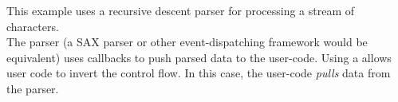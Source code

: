 \label{appendix}
This example uses a recursive descent parser for processing a stream of
characters.\\
The parser (a SAX parser or other event-dispatching framework would be
equivalent) uses callbacks to push parsed data to the user-code.
Using a \sfcoro allows user code to invert the control flow. In this case, the
user-code \textit{pulls} data from the parser.
